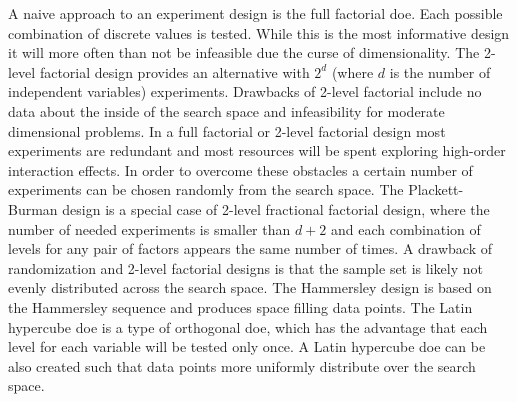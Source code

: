 A naive approach to an experiment design is the full factorial \gls{doe}.
Each possible combination of discrete values is tested. 
While this is the most informative design it will more often than not be infeasible due the curse of dimensionality\cite{cherkassky1998learning}.
The 2-level factorial design provides an alternative with $2^d$ (where $d$ is the number of independent variables) experiments. 
Drawbacks of 2-level factorial include no data about the inside of the search space and infeasibility for moderate dimensional problems.
In a full factorial or 2-level factorial design most experiments are redundant and most resources will be spent exploring high-order interaction effects\cite{gunst2009fractional}.
In order to overcome these obstacles a certain number of experiments can be chosen randomly from the search space. 
%
%
The Plackett-Burman\cite{vanaja2007design,miller2001using,wang1995hidden} design is a special case of 2-level fractional factorial design, 
where the number of needed experiments is smaller than $d+2$ and 
each combination of levels for any pair of factors appears the same number of times. 
A drawback of randomization and 2-level factorial designs is that the sample set is likely not evenly distributed across the search space\cite{viana2016tutorial}. 
The Hammersley design\cite{viana2016tutorial,diwekar1997efficient} is based on the Hammersley sequence and produces space filling data points. 
The Latin hypercube \gls{doe}\cite{viana2016tutorial,diwekar1997efficient} is a type of orthogonal \gls{doe}, 
which has the advantage that each level for each variable will be tested only once. 
A Latin hypercube \gls{doe} can be also created such that data points more uniformly distribute over the search space. 
%

